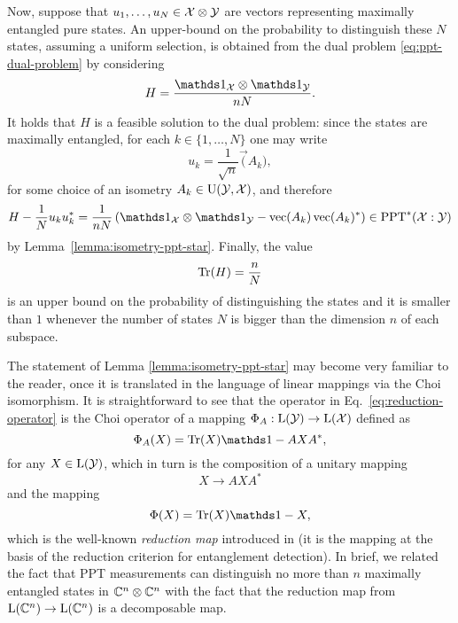 Now, suppose that $u_1,\ldots,u_N\in\mathcal{X}\otimes\mathcal{Y}$ are vectors representing
maximally entangled pure states.
An upper-bound on the probability to distinguish these $N$ states, assuming
a uniform selection, is obtained from the dual problem \eqref{eq:ppt-dual-problem}
by considering
\begin{equation}
  H = \frac{\I_{\X}\otimes\I_{\Y}}{nN}.
\end{equation}
It holds that $H$ is a feasible solution to the dual problem:
since the states are maximally entangled, for each $k\in\{1,\ldots,N\}$ one may write
\begin{equation}
  u_k = \frac{1}{\sqrt{n}}\vec(A_k),
\end{equation}
for some choice of an isometry $A_k\in\mathrm{U}(\mathcal{Y},\mathcal{X})$, and therefore
\begin{equation}
  H - \frac{1}{N}u_k u_k^{\ast} = \frac{1}{nN}\left(
  \I_{\X}\otimes\I_{\Y} - \vec(A_k) \vec(A_k)^{\ast}\right) \in \PPTStar(\X:\Y)
\end{equation}
by Lemma~\ref{lemma:isometry-ppt-star}.
Finally, the value
\begin{equation}
\operatorname{Tr}(H) = \frac{n}{N}
\end{equation}
is an upper bound on the probability of distinguishing the states and it is smaller 
than $1$ whenever the number of states $N$ is bigger than the dimension $n$ of
each subspace.
\begin{remark}
The statement of Lemma \ref{lemma:isometry-ppt-star} may become very familiar to the reader, 
once it is translated in the language of linear mappings via the Choi isomorphism.
It is straightforward to see that the operator in Eq.~\ref{eq:reduction-operator}
is the Choi operator of a mapping $\Phi_{A}:\mathrm{L}(\mathcal{Y})\to\mathrm{L}(\mathcal{X})$ defined as
\begin{equation}
  \Phi_{A}(X) = \tr(X)\I - AXA^{\ast},
\end{equation}
for any $X\in\mathrm{L}(\mathcal{Y})$, which in turn is the composition of a unitary mapping
\begin{equation}
  X \to AXA^{\ast}
\end{equation}
and the mapping
\begin{equation}
  \Phi(X) = \tr(X)\I - X,
\end{equation}
which is the well-known \emph{reduction map} introduced in \cite{Horodecki99} 
(it is the mapping at the basis of the reduction criterion for entanglement detection).
In brief, we related the fact that PPT measurements can distinguish no more than 
$n$ maximally entangled states in $\mathbb{C}^{n}\otimes\mathbb{C}^{n}$ with the fact
that the reduction map from $\mathrm{L}(\mathbb{C}^{n})\to\mathrm{L}(\mathbb{C}^{n})$ is a decomposable map.
\end{remark}

